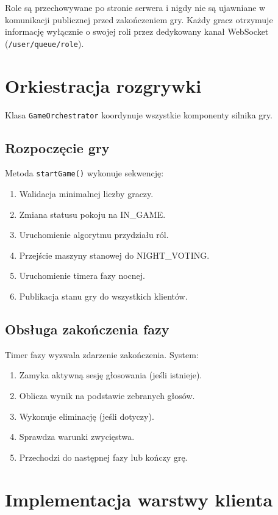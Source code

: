 ﻿\documentclass[a4paper,twoside,11pt]{mwrep}
\theoremstyle{plain} \newtheorem{thm}{Twierdzenie}
\theoremstyle{plain} \newtheorem{lem}{Lemat}
\theoremstyle{definition} \newtheorem{defn}{Definicja}
\theoremstyle{remark} \newtheorem*{rem}{Wniosek}
\begin{document}
Role są przechowywane po stronie serwera i nigdy nie są ujawniane w komunikacji publicznej przed zakończeniem gry. Każdy gracz otrzymuje informację wyłącznie o swojej roli przez dedykowany kanał WebSocket (\texttt{/user/queue/role}).

\section{Orkiestracja rozgrywki}

Klasa \texttt{GameOrchestrator} koordynuje wszystkie komponenty silnika gry.

\subsection{Rozpoczęcie gry}

Metoda \texttt{startGame()} wykonuje sekwencję:
\begin{enumerate}
    \item Walidacja minimalnej liczby graczy.
    \item Zmiana statusu pokoju na IN\_GAME.
    \item Uruchomienie algorytmu przydziału ról.
    \item Przejście maszyny stanowej do NIGHT\_VOTING.
    \item Uruchomienie timera fazy nocnej.
    \item Publikacja stanu gry do wszystkich klientów.
\end{enumerate}

\subsection{Obsługa zakończenia fazy}

Timer fazy wyzwala zdarzenie zakończenia. System:
\begin{enumerate}
    \item Zamyka aktywną sesję głosowania (jeśli istnieje).
    \item Oblicza wynik na podstawie zebranych głosów.
    \item Wykonuje eliminację (jeśli dotyczy).
    \item Sprawdza warunki zwycięstwa.
    \item Przechodzi do następnej fazy lub kończy grę.
\end{enumerate}

\section{Implementacja warstwy klienta}
\end{document}
